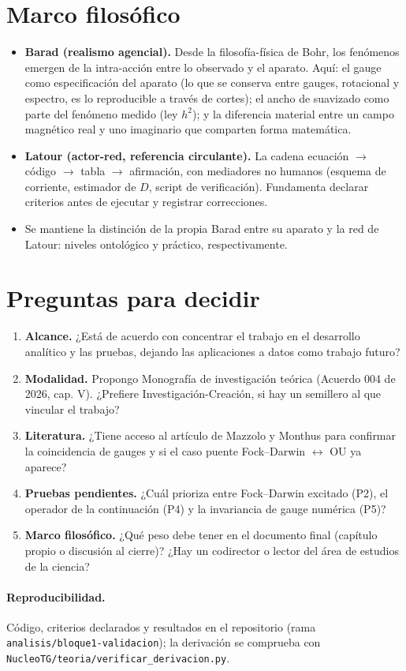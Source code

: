 \documentclass[11pt,a4paper]{article}
\begin{document}
\section{Marco filos\'ofico}
\begin{itemize}[leftmargin=1.6em]
  \item \textbf{Barad (realismo agencial).} Desde la filosof\'ia-f\'isica de Bohr, los fen\'omenos emergen de la
        intra-acci\'on entre lo observado y el aparato. Aqu\'i: el gauge como especificaci\'on del aparato (lo
        que se conserva entre gauges, rotacional y espectro, es lo reproducible a trav\'es de cortes); el ancho
        de suavizado como parte del fen\'omeno medido (ley $h^2$); y la diferencia material entre un campo
        magn\'etico real y uno imaginario que comparten forma matem\'atica.
  \item \textbf{Latour (actor-red, referencia circulante).} La cadena ecuaci\'on $\to$ c\'odigo $\to$ tabla
        $\to$ afirmaci\'on, con mediadores no humanos (esquema de corriente, estimador de $D$, script de
        verificaci\'on). Fundamenta declarar criterios antes de ejecutar y registrar correcciones.
  \item Se mantiene la distinci\'on de la propia Barad entre su aparato y la red de Latour: niveles
        ontol\'ogico y pr\'actico, respectivamente.
\end{itemize}

\section{Preguntas para decidir}
\begin{enumerate}[leftmargin=1.8em]
  \item \textbf{Alcance.} ¿Est\'a de acuerdo con concentrar el trabajo en el desarrollo anal\'itico y las
        pruebas, dejando las aplicaciones a datos como trabajo futuro?
  \item \textbf{Modalidad.} Propongo Monograf\'ia de investigaci\'on te\'orica (Acuerdo 004 de 2026, cap. V).
        ¿Prefiere Investigaci\'on-Creaci\'on, si hay un semillero al que vincular el trabajo?
  \item \textbf{Literatura.} ¿Tiene acceso al art\'iculo de Mazzolo y Monthus para confirmar la coincidencia de
        gauges y si el caso puente Fock--Darwin $\leftrightarrow$ OU ya aparece?
  \item \textbf{Pruebas pendientes.} ¿Cu\'al prioriza entre Fock--Darwin excitado (P2), el operador de la
        continuaci\'on (P4) y la invariancia de gauge num\'erica (P5)?
  \item \textbf{Marco filos\'ofico.} ¿Qu\'e peso debe tener en el documento final (cap\'itulo propio o
        discusi\'on al cierre)? ¿Hay un codirector o lector del \'area de estudios de la ciencia?
\end{enumerate}

\paragraph{Reproducibilidad.} C\'odigo, criterios declarados y resultados en el repositorio (rama
\texttt{analisis/bloque1-validacion}); la derivaci\'on se comprueba con
\texttt{NucleoTG/teoria/verificar\_derivacion.py}.
\end{document}
